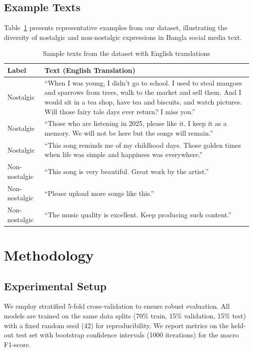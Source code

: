 \documentclass[conference]{IEEEtran}
\begin{document}
\subsection{Example Texts}

Table~\ref{tab:dataset_samples} presents representative examples from our dataset, illustrating the diversity of nostalgic and non-nostalgic expressions in Bangla social media text.

\begin{table}[h]
\centering
\caption{Sample texts from the dataset with English translations}
\label{tab:dataset_samples}
\begin{tabular}{p{}p{}}
\toprule
\textbf{Label} & \textbf{Text (English Translation)} \\
\midrule
Nostalgic & ``When I was young, I didn't go to school. I used to steal mangoes and sparrows from trees, walk to the market and sell them. And I would sit in a tea shop, have tea and biscuits, and watch pictures. Will those fairy tale days ever return? I miss you.'' \\
\midrule
Nostalgic & ``Those who are listening in 2025, please like it. I keep it as a memory. We will not be here but the songs will remain.'' \\
\midrule
Nostalgic & ``This song reminds me of my childhood days. Those golden times when life was simple and happiness was everywhere.'' \\
\midrule
Non-nostalgic & ``This song is very beautiful. Great work by the artist.'' \\
\midrule
Non-nostalgic & ``Please upload more songs like this.'' \\
\midrule
Non-nostalgic & ``The music quality is excellent. Keep producing such content.'' \\
\bottomrule
\end{tabular}
\end{table}

\section{Methodology}
\label{sec:methodology}

\subsection{Experimental Setup}

We employ stratified 5-fold cross-validation to ensure robust evaluation. All models are trained on the same data splits (70\% train, 15\% validation, 15\% test) with a fixed random seed (42) for reproducibility. We report metrics on the held-out test set with bootstrap confidence intervals (1000 iterations) for the macro F1-score.
\end{document}
